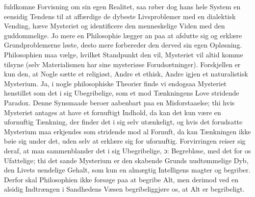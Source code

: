 \documentclass[12pt]{book}
\newcommand{\dsi}{\textup{ɔ:}}
\newcommand{\divrule}{\begin{center}%
  \rule{0.27\linewidth}{0.9pt}\\[1.6pt]\rule{0.22\linewidth}{0.4pt}\end{center}}
\begin{document}
fuldkomne Forvisning om sin egen Realitet, saa røber dog hans hele System en eensidig
Tendens til at affærdige de dybeste Livsproblemer med en dialektisk Vending, hæve
Mysteriet og identificere den menneskelige Viden med den guddommelige. Jo mere en
Philosophie lægger an paa at afslutte sig og erklære Grundproblemerne løste, desto
mere forbereder den derved sin egen Opløsning. Philosophien maa vælge, hvilket
Standpunkt den vil, Mysteriet vil altid komme tilsyne (selv Materialismen har sine
mysteriøse Forudsætninger). Forskjellen er kun den, at Nogle sætte et religiøst, Andre
et ethisk, Andre igjen et naturalistisk Mysterium. Ja, i nogle philosophiske Theorier
finde vi endogsaa Mysteriet henstillet som det i sig Ubegribelige, som et mod
Tænkningens Love stridende Paradox. Denne Synsmaade beroer aabenbart paa en
Misforstaaelse; thi hvis Mysteriet antages at have et fornuftigt Indhold, da kan det
kun være en ufornuftig Tænkning, der finder det i sig selv utænkeligt, og hvis det
forudsatte Mysterium maa erkjendes som stridende mod al Fornuft, da kan Tænkningen
ikke bøie sig under det, uden selv at erklære sig for ufornuftig. Forvirringen reiser
sig deraf, at man sammenblander det i sig Ubegribelige, \dsi{} Begrebløse, med det for
os Ufattelige; thi det sande Mysterium er den skabende Grunds uudtømmelige Dyb, den
Livets uendelige Gehalt, som kun en almægtig Intelligens magter og begriber. Derfor
skal Philosophien ikke forsøge paa at begribe Alt, men derimod ved en alsidig
Indtrængen i Sandhedens Væsen begribeliggjøre os, at Alt er begribeligt.
\end{document}
